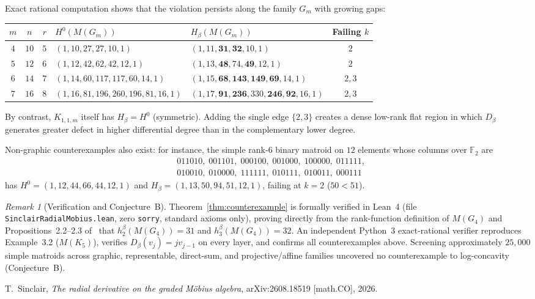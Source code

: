 \documentclass[11pt]{article}
\theoremstyle{remark}
\newtheorem{remark}[theorem]{Remark}
\begin{document}
Exact rational computation shows that the violation persists along the family $G_m$ with growing gaps:
\begin{center}
\small
\setlength{\tabcolsep}{4pt}
\begin{tabular}{cccllc}
\toprule
$m$ & $n$ & $r$ & $H^0(M(G_m))$ & $H_\beta(M(G_m))$ & Failing $k$ \\
\midrule
$4$ & $10$ & $5$ & $(1,10,27,27,10,1)$ & $(1,11,\mathbf{31},\mathbf{32},10,1)$ & $2$ \\
$5$ & $12$ & $6$ & $(1,12,42,62,42,12,1)$ & $(1,13,\mathbf{48},74,\mathbf{49},12,1)$ & $2$ \\
$6$ & $14$ & $7$ & $(1,14,60,117,117,60,14,1)$ & $(1,15,\mathbf{68},\mathbf{143},\mathbf{149},\mathbf{69},14,1)$ & $2, 3$ \\
$7$ & $16$ & $8$ & $(1,16,81,196,260,196,81,16,1)$ & $(1,17,\mathbf{91},\mathbf{236},330,\mathbf{246},\mathbf{92},16,1)$ & $2, 3$ \\
\bottomrule
\end{tabular}
\end{center}
By contrast, $K_{1,1,m}$ itself has $H_\beta = H^0$ (symmetric). Adding the single edge $\{2, 3\}$ creates a dense low-rank flat region in which $D_\beta$ generates greater defect in higher differential degree than in the complementary lower degree.

Non-graphic counterexamples also exist: for instance, the simple rank-$6$ binary matroid on $12$ elements whose columns over $\mathbb{F}_2$ are
\begin{align*}
&011010,\; 001101,\; 000100,\; 001000,\; 100000,\; 011111, \\
&010010,\; 010000,\; 111111,\; 010111,\; 010011,\; 000111
\end{align*}
has $H^0 = (1, 12, 44, 66, 44, 12, 1)$ and $H_\beta = (1, 13, 50, 94, 51, 12, 1)$, failing at $k = 2$ ($50 < 51$).

\begin{remark}[Verification and Conjecture~B]
Theorem~\ref{thm:counterexample} is formally verified in Lean~4 (file \texttt{SinclairRadialMobius.lean}, zero \texttt{sorry}, standard axioms only), proving directly from the rank-function definition of $M(G_4)$ and Propositions~2.2--2.3 of~\cite{Sinclair2026} that $h_2^\beta(M(G_4)) = 31$ and $h_3^\beta(M(G_4)) = 32$. An independent Python~3 exact-rational verifier reproduces Example~3.2 ($M(K_5)$), verifies $D_\beta(v_j) = j v_{j-1}$ on every layer, and confirms all counterexamples above. Screening approximately $25{,}000$ simple matroids across graphic, representable, direct-sum, and projective/affine families uncovered no counterexample to log-concavity (Conjecture~B).
\end{remark}

\begin{thebibliography}{9}
T.~Sinclair, \emph{The radial derivative on the graded M\"obius algebra}, arXiv:2608.18519 [math.CO], 2026.
\end{thebibliography}
\end{document}
